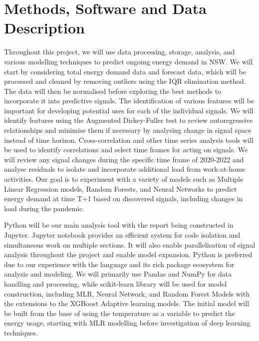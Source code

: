 \documentclass[mstat,12pt]{unswthesis}
\begin{document}
\hypertarget{methods-software-and-data-description}{%
\section{Methods, Software and Data
Description}\label{methods-software-and-data-description}}

Throughout this project, we will use data processing, storage, analysis, and various modelling techniques to predict ongoing energy demand in NSW. We will start by considering total energy demand data and forecast data, which will be processed and cleaned by removing outliers using the IQR elimination method. The data will then be normalised before exploring the best methods to incorporate it into predictive signals. The identification of various features will be important for developing potential uses for each of the individual signals. We will identify features using the Augmented Dickey-Fuller test to review autoregressive relationships and minimise them if necessary by analysing change in signal space instead of time horizon. Cross-correlation and other time series analysis tools will be used to identify correlations and select time frames for acting on signals. We will review any signal changes during the specific time frame of 2020-2022 and analyse residuals to isolate and incorporate additional load from work-at-home activities. Our goal is to experiment with a variety of models such as Multiple Linear Regression models, Random Forests, and Neural Networks to predict energy demand at time T+1 based on discovered signals, including changes in load during the pandemic.

\bigskip

Python will be our main analysis tool with the report being constructed in Jupyter. Jupyter notebook provides an efficient system for code isolation and simultaneous work on multiple sections. It will also enable parallelisation of signal analysis throughout the project and enable model expansion. Python is preferred due to our experience with the language and its rich package ecosystem for analysis and modeling. We will primarily use Pandas and NumPy for data handling and processing, while scikit-learn library will be used for model construction, including MLR, Neural Network, and Random Forest Models with the extensions to the XGBoost Adaptive learning models. The initial model will be built from the base of using the temperature as a variable to predict the energy usage, starting with MLR modelling before investigation of deep learning techniques.
\end{document}
